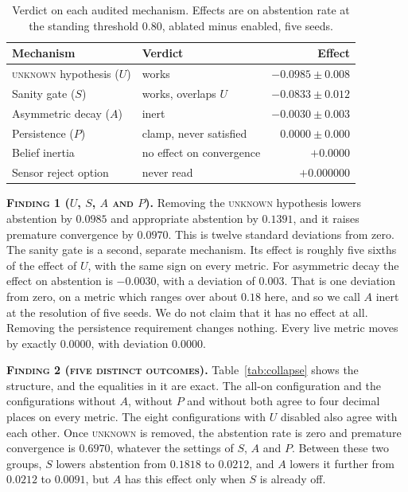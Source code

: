 \documentclass[conference]{IEEEtran}
\newcommand{\finding}[1]{\textsc{#1}}
\begin{document}
\begin{table}[t]
\caption{Verdict on each audited mechanism. Effects are on abstention rate at
the standing threshold $0.80$, ablated minus enabled, five seeds.}
\label{tab:verdicts}
\centering
\small
\begin{tabular}{@{}llr@{}}
\toprule
Mechanism & Verdict & Effect \\
\midrule
\textsc{unknown} hypothesis ($U$) & works & $-0.0985 \pm 0.008$ \\
Sanity gate ($S$) & works, overlaps $U$ & $-0.0833 \pm 0.012$ \\
Asymmetric decay ($A$) & inert & $-0.0030 \pm 0.003$ \\
Persistence ($P$) & clamp, never satisfied & $0.0000 \pm 0.000$ \\
Belief inertia & no effect on convergence & $+0.0000$ \\
Sensor reject option & never read & $+0.000000$ \\
\bottomrule
\end{tabular}
\end{table}

\textbf{\finding{Finding 1 ($U$, $S$, $A$ and $P$).}}
Removing the \textsc{unknown} hypothesis lowers abstention by $0.0985$ and
appropriate abstention by $0.1391$, and it raises premature convergence by
$0.0970$. This is twelve standard deviations from zero. The sanity gate is a
second, separate mechanism. Its effect is roughly five sixths of the effect of
$U$, with the same sign on every metric. For asymmetric decay the effect on
abstention is $-0.0030$, with a deviation of $0.003$. That is one deviation from
zero, on a metric which ranges over about $0.18$ here, and so we call $A$ inert
at the resolution of five seeds. We do not claim that it has no effect at all.
Removing the persistence requirement changes nothing. Every live metric moves
by exactly $0.0000$, with deviation $0.0000$.

\textbf{\finding{Finding 2 (five distinct outcomes).}}
Table~\ref{tab:collapse} shows the structure, and the equalities in it are
exact. The all-on configuration and the configurations without $A$, without
$P$ and without both agree to four decimal places on every metric. The eight
configurations with $U$ disabled also agree with each other. Once
\textsc{unknown} is removed, the abstention rate is zero and premature
convergence is $0.6970$, whatever the settings of $S$, $A$ and $P$. Between
these two groups, $S$ lowers abstention from $0.1818$ to $0.0212$, and $A$
lowers it further from $0.0212$ to $0.0091$, but $A$ has this effect only when
$S$ is already off.
\end{document}
